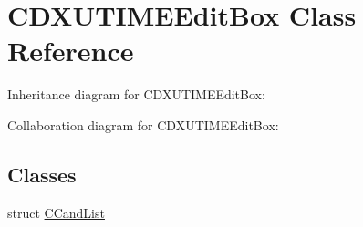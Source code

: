 \hypertarget{class_c_d_x_u_t_i_m_e_edit_box}{\section{C\+D\+X\+U\+T\+I\+M\+E\+Edit\+Box Class Reference}
\label{class_c_d_x_u_t_i_m_e_edit_box}
}


Inheritance diagram for C\+D\+X\+U\+T\+I\+M\+E\+Edit\+Box\+:


Collaboration diagram for C\+D\+X\+U\+T\+I\+M\+E\+Edit\+Box\+:
\subsection*{Classes}
\begin{DoxyCompactItemize}
\item 
struct \hyperlink{struct_c_d_x_u_t_i_m_e_edit_box_1_1_c_cand_list}{C\+Cand\+List}
\end{DoxyCompactItemize}
